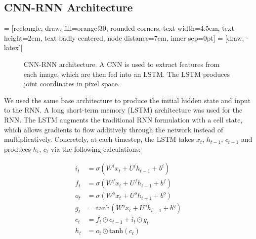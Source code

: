 \documentclass[11pt,twocolumn,letterpaper]{article}
\begin{document}
\subsection{CNN-RNN Architecture}

 = [rectangle, draw, fill=orange!30, rounded corners, text width=4.5em, text height=2em, text badly centered, node distance=7em, inner sep=0pt]
 = [draw, -latex']


\begin{figure}
\begin{center}
\label{model_diag}
\caption{CNN-RNN architecture. A CNN is used to extract features from each image, which are
then fed into an LSTM. The LSTM produces joint coordinates in pixel space.}
\label{fig:lstm_diag}
\end{center}
\end{figure}

We used the same base architecture to produce the initial hidden state and input
to the RNN. A long short-term memory (LSTM) architecture was used for the RNN. The LSTM
augments the traditional RNN formulation with a cell state, which allows
gradients to flow additively through the network instead of multiplicatively.
Concretely, at each timestep, the LSTM takes $x_t$, $h_{t-1}$,
$c_{t-1}$ and produces $h_t$, $c_t$ via the following calculations:

\begin{align*}
    i_t &= \sigma(W^ix_t + U^ih_{t-1} + b^i)\\
    f_t &= \sigma(W^fx_t + U^fh_{t-1} + b^f)\\
    o_t &= \sigma(W^ox_t + U^oh_{t-1} + b^o)\\
    g_t &= \text{tanh}(W^gx_t + U^gh_{t-1} + b^g)\\
    c_t &= f_t \odot c_{t-1} + i_t \odot g_t\\
    h_t &= o_t \odot \text{tanh}(c_t)
\end{align*}
\end{document}
